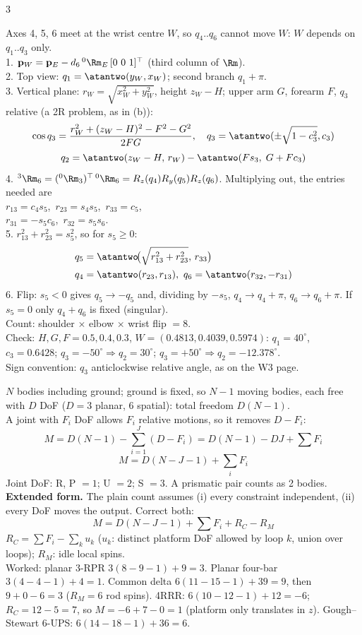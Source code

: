 \begin{multicols}{3}
\begin{fbx}
Axes 4, 5, 6 meet at the wrist centre $W$, so $q_4..q_6$ cannot move $W$: $W$ depends on $q_1..q_3$ only.\\
1. $\mathbf p_W=\mathbf p_E-d_6\,{}^0\Rm_E\,[0\ 0\ 1]^\top$ (third column of $\Rm$).\\
2. Top view: $q_1=\atantwo(y_W,x_W)$; second branch $q_1+\pi$.\\
3. Vertical plane: $r_W=\sqrt{x_W^2+y_W^2}$, height $z_W-H$; upper arm $G$, forearm $F$, $q_3$ relative (a 2R problem, as in (b)):
\[\cos q_3=\frac{r_W^2+(z_W-H)^2-F^2-G^2}{2FG},\quad q_3=\atantwo(\pm\sqrt{1-c_3^2},c_3)\]
\[q_2=\atantwo(z_W-H,\,r_W)-\atantwo(Fs_3,\;G+Fc_3)\]
4. ${}^3\Rm_6=({}^0\Rm_3)^\top\,{}^0\Rm_6=R_z(q_4)R_y(q_5)R_z(q_6)$. Multiplying out, the entries needed are\\
$r_{13}=c_4s_5$,\ $r_{23}=s_4s_5$,\ $r_{33}=c_5$,\\ $r_{31}=-s_5c_6$,\ $r_{32}=s_5s_6$.\\
5. $r_{13}^2+r_{23}^2=s_5^2$, so for $s_5\ge0$:
\[\begin{aligned}q_5&=\atantwo\!\big(\sqrt{r_{13}^2+r_{23}^2},\,r_{33}\big)\\ q_4&=\atantwo(r_{23},r_{13}),\ q_6=\atantwo(r_{32},-r_{31})\end{aligned}\]
6. Flip: $s_5<0$ gives $q_5\to-q_5$ and, dividing by $-s_5$, $q_4\to q_4+\pi$, $q_6\to q_6+\pi$. If $s_5=0$ only $q_4+q_6$ is fixed (singular).\\
Count: shoulder $\times$ elbow $\times$ wrist flip $=8$.\\
Check: $H,G,F=0.5,0.4,0.3$, $W=(0.4813,0.4039,0.5974)$: $q_1=40^\circ$, $c_3=0.6428$; $q_3=-50^\circ\Rightarrow q_2=30^\circ$; $q_3=+50^\circ\Rightarrow q_2=-12.378^\circ$. \chk\\
Sign convention: $q_3$ anticlockwise relative angle, as on the W3 page.
\end{fbx}

\begin{fbx}
$N$ bodies including ground; ground is fixed, so $N-1$ moving bodies, each free with $D$ DoF ($D=3$ planar, 6 spatial): total freedom $D(N-1)$.\\
A joint with $F_i$ DoF allows $F_i$ relative motions, so it removes $D-F_i$:
\[M=D(N-1)-\sum_{i=1}^J(D-F_i)=D(N-1)-DJ+\sum F_i\]
\[\boxed{M=D(N-J-1)+\textstyle\sum_iF_i}\]
Joint DoF: R, P $=1$; U $=2$; S $=3$. A prismatic pair counts as 2 bodies.\\
\textbf{Extended form.} The plain count assumes (i) every constraint independent, (ii) every DoF moves the output. Correct both:
\[M=D(N-J-1)+\sum F_i+R_C-R_M\]
$R_C=\sum F_i-\sum_k u_k$ ($u_k$: distinct platform DoF allowed by loop $k$, union over loops); $R_M$: idle local spins.\\
Worked: planar 3-RPR $3(8-9-1)+9=3$. Planar four-bar $3(4-4-1)+4=1$. Common delta $6(11-15-1)+39=9$, then $9+0-6=3$ ($R_M=6$ rod spins). 4RRR: $6(10-12-1)+12=-6$; $R_C=12-5=7$, so $M=-6+7-0=1$ (platform only translates in $z$). Gough--Stewart 6-UPS: $6(14-18-1)+36=6$. \chk
\end{fbx}


\end{multicols}
